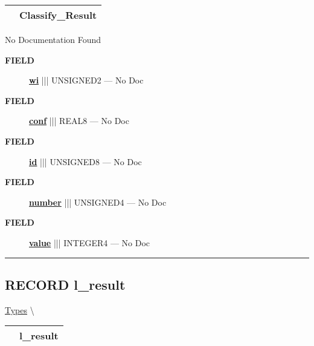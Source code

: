 {\renewcommand{\arraystretch}{1.5}
\begin{tabularx}{\textwidth}{|>{\raggedright\arraybackslash}l|X|}
\hline
\hspace{0pt}\mytexttt{\color{red} } & \textbf{Classify\_Result} \\
\hline
\end{tabularx}
}

\par





No Documentation Found







\par
\begin{description}
\item [\colorbox{tagtype}{\color{white} \textbf{\textsf{FIELD}}}] \textbf{\underline{wi}} ||| UNSIGNED2 --- No Doc
\item [\colorbox{tagtype}{\color{white} \textbf{\textsf{FIELD}}}] \textbf{\underline{conf}} ||| REAL8 --- No Doc
\item [\colorbox{tagtype}{\color{white} \textbf{\textsf{FIELD}}}] \textbf{\underline{id}} ||| UNSIGNED8 --- No Doc
\item [\colorbox{tagtype}{\color{white} \textbf{\textsf{FIELD}}}] \textbf{\underline{number}} ||| UNSIGNED4 --- No Doc
\item [\colorbox{tagtype}{\color{white} \textbf{\textsf{FIELD}}}] \textbf{\underline{value}} ||| INTEGER4 --- No Doc
\end{description}





\rule{\linewidth}{0.5pt}
\subsection*{\textsf{\colorbox{headtoc}{\color{white} RECORD}
l\_result}}

\hypertarget{ecldoc:ml_core.types.l_result}{}
\hspace{0pt} \hyperlink{ecldoc:ML_Core.Types}{Types} \textbackslash 

{\renewcommand{\arraystretch}{1.5}
\begin{tabularx}{\textwidth}{|>{\raggedright\arraybackslash}l|X|}
\hline
\hspace{0pt}\mytexttt{\color{red} } & \textbf{l\_result} \\
\hline
\end{tabularx}
}

